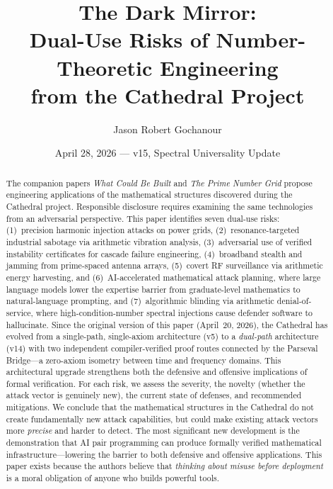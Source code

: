 \documentclass[11pt,a4paper]{article}
\title{%
  The Dark Mirror:\\
  Dual-Use Risks of Number-Theoretic Engineering\\
  from the Cathedral Project%
}
\author{
  Jason Robert Gochanour
}
\date{April 28, 2026 --- v15, Spectral Universality Update}
\begin{document}
\maketitle

\begin{abstract}
The companion papers \emph{What Could Be Built} and \emph{The
Prime Number Grid} propose engineering applications of the
mathematical structures discovered during the Cathedral project.
Responsible disclosure requires examining the same technologies
from an adversarial perspective. This paper identifies seven
dual-use risks: (1)~precision harmonic injection attacks on power
grids, (2)~resonance-targeted industrial sabotage via arithmetic
vibration analysis, (3)~adversarial use of verified instability
certificates for cascade failure engineering, (4)~broadband stealth
and jamming from prime-spaced antenna arrays, (5)~covert RF
surveillance via arithmetic energy harvesting, and
(6)~AI-accelerated mathematical attack planning, where large
language models lower the expertise barrier from graduate-level
mathematics to natural-language prompting, and
(7)~algorithmic blinding via arithmetic denial-of-service,
where high-condition-number spectral injections cause
defender software to hallucinate.
Since the original version of this paper (April~20, 2026),
the Cathedral has evolved from a single-path, single-axiom
architecture (v5) to a \emph{dual-path} architecture (v14) with
two independent compiler-verified proof routes connected by the
Parseval Bridge---a zero-axiom isometry between time and frequency
domains. This architectural upgrade strengthens both the defensive
and offensive implications of formal verification.
For each risk, we
assess the severity, the novelty (whether the attack vector is
genuinely new), the current state of defenses, and recommended
mitigations. We conclude that the mathematical structures in the
Cathedral do not create fundamentally new attack capabilities, but
could make existing attack vectors more \emph{precise} and harder
to detect. The most significant new development is the
demonstration that AI pair programming can produce formally verified
mathematical infrastructure---lowering the barrier to both
defensive and offensive applications.
This paper exists because the authors believe
that \emph{thinking about misuse before deployment} is a moral
obligation of anyone who builds powerful tools.
\end{abstract}

\tableofcontents

\end{document}
